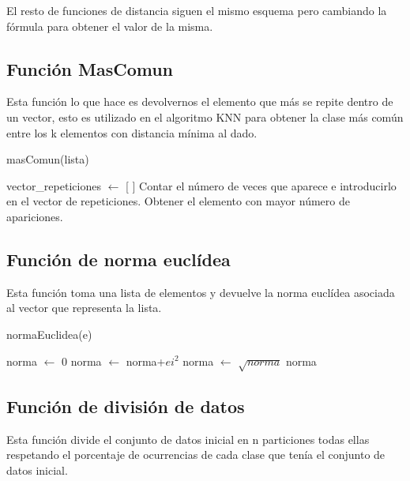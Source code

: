 \documentclass[12pt,a4paper]{article}
\begin{document}
	El resto de funciones de distancia siguen el mismo esquema pero cambiando la fórmula para obtener el valor de la misma.
	
	\subsection{Función MasComun}
	
	Esta función lo que hace es devolvernos el elemento que más se repite dentro de un vector, esto es utilizado en el algoritmo KNN para obtener la clase más común entre los k elementos con distancia mínima al dado.
	
	\begin{algorithm}
		\caption{masComun(lista)}
		\begin{algorithmic}
			\STATE vector\_repeticiones $\leftarrow$ [ ]
				\STATE Contar el número de veces que aparece e introducirlo en el vector de repeticiones.
			\ENDFOR
			\STATE Obtener el elemento con mayor número de apariciones.
		\end{algorithmic}
	\end{algorithm}
	
	\subsection{Función de norma euclídea}
	
	Esta función toma una lista de elementos y devuelve la norma euclídea asociada al vector que representa la lista.
	
	\begin{algorithm}
		\caption{normaEuclidea(e)}
		\begin{algorithmic}
			\STATE norma $\leftarrow$ 0
			\FOR{ei en e}
				\STATE norma $\leftarrow$ norma+$ei^2$
			\ENDFOR
			\STATE norma $\leftarrow$ $\sqrt{norma}$
			\RETURN norma
		\end{algorithmic}
	\end{algorithm}
	
	\subsection{Función de división de datos}

	Esta función divide el conjunto de datos inicial en n particiones todas ellas respetando el porcentaje de ocurrencias de cada clase que tenía el conjunto de datos inicial.
	
\end{document}
